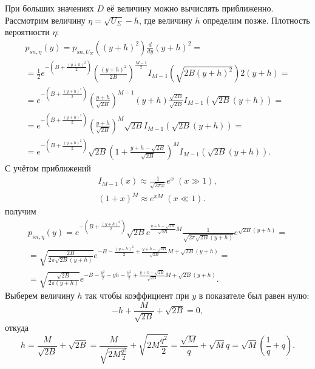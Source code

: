 \documentclass[a4paper,12pt]{article}
\newcommand{\fd}[1]{ \frac{d}{d #1}}
\begin{document}
    При больших значениях $D$ её величину можно вычислять приближенно. Рассмотрим величину $\eta = \sqrt{U_\Sigma} - h$, где величину $h$ определим позже.
    Плотность вероятности $\eta$:
    \begin{multline*}
        p_{sn,\eta}(y)
        = p_{sn,U_\Sigma}((y+h)^2) \fd{y}(y+h)^2 = \\
        = \frac{1}{2} e^{- \left ( B + \frac{(y+h)^2}{2} \right )} \left ( \frac{(y+h)^2}{2 B} \right )^\frac{M-1}{2} I_{M-1} \left ( \sqrt{2 B (y+h)^2} \right ) 2 (y+h) = \\
        = e^{- \left ( B + \frac{(y+h)^2}{2} \right )} \left ( \frac{y+h}{\sqrt{2 B}} \right )^{M-1} (y+h) \frac{\sqrt{2 B}}{\sqrt{2 B}} I_{M-1} \left ( \sqrt{2 B} (y+h) \right ) = \\
        = e^{- \left ( B + \frac{(y+h)^2}{2} \right )} \left ( \frac{y+h}{\sqrt{2 B}} \right )^M \sqrt{2 B} I_{M-1} \left ( \sqrt{2 B} (y+h) \right ) = \\
        = e^{- \left ( B + \frac{(y+h)^2}{2} \right )} \sqrt{2 B} \left ( 1 + \frac{y + h - \sqrt{2 B}}{\sqrt{2 B}} \right )^M I_{M-1} \left ( \sqrt{2 B} (y+h) \right ) .
    \end{multline*}
    С учётом приближений
    \begin{gather*}
        I_{M-1}(x) \approx \frac{1}{\sqrt{2 \pi x}} e^x \; ( x \gg 1 ) , \\
        ( 1 + x )^M \approx e^{x M} \; ( x \ll 1 ) .
    \end{gather*}
    получим
    \begin{multline*}
        p_{sn,\eta}(y)
        = e^{- \left ( B + \frac{(y+h)^2}{2} \right )} \sqrt{2 B} e^{\frac{y + h - \sqrt{2 B}}{\sqrt{2 B}} M} \frac{1}{\sqrt{2 \pi \sqrt{2 B} (y + h)}} e^{\sqrt{2 B} (y + h)} = \\
        = \sqrt{\frac{2 B}{2 \pi \sqrt{2 B} (y + h)}} e^{- B - \frac{(y+h)^2}{2} + \frac{y + h - \sqrt{2 B}}{\sqrt{2 B}} M + \sqrt{2 B} (y + h)} = \\
        = \sqrt{\frac{\sqrt{2 B}}{2 \pi (y + h)}} e^{- B - \frac{y^2}{2} - y h - \frac{h^2}{2} + \frac{y + h - \sqrt{2 B}}{\sqrt{2 B}} M + \sqrt{2 B} (y + h)} .
    \end{multline*}
    Выберем величину $h$ так чтобы коэффициент при $y$ в показателе был равен нулю:
    \[
        -h + \frac{M}{\sqrt{2 B}} + \sqrt{2 B} = 0 ,
    \]
    откуда
    \[
        h
        = \frac{M}{\sqrt{2 B}} + \sqrt{2 B}
        = \frac{M}{\sqrt{2 M \frac{q^2}{2}}} + \sqrt{2 M \frac{q^2}{2}}
        = \frac{\sqrt{M}}{q} + \sqrt{M} q
        = \sqrt{M} \left ( \frac{1}{q} + q \right ) .
    \]
\end{document}
